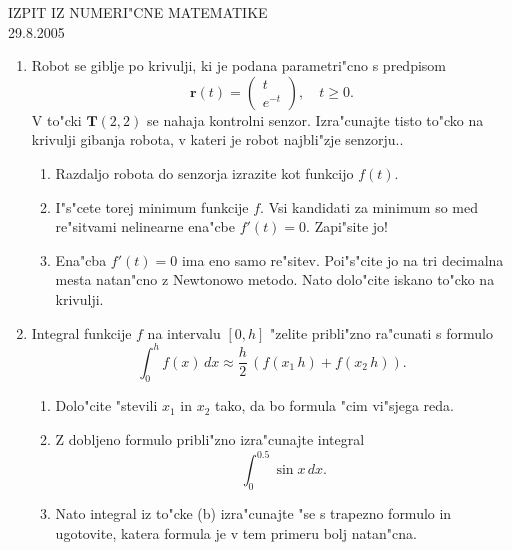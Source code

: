 

\begin{center}
  {\large IZPIT IZ NUMERI"CNE MATEMATIKE\\
    29.8.2005}
\end{center}
\vspace{1.5cm}
\begin{enumerate}
  \item Robot se giblje po krivulji, ki je podana parametri"cno
        s predpisom
        $$\mathbf{r}(t)=
        \left(
          \begin{array}{c}
            t\\
            e^{-t}
          \end{array}
        \right),\quad t\geq 0.
        $$
        V to"cki $\mathbf{T}(2,2)$ se nahaja kontrolni senzor. 
        Izra"cunajte tisto to"cko na krivulji gibanja 
        robota, v kateri je robot najbli"zje senzorju.. 
  \begin{enumerate}
    \item Razdaljo robota do senzorja izrazite kot funkcijo
      $f(t)$.
    \item I"s"cete torej minimum funkcije $f$. Vsi kandidati za 
      minimum so med re"sitvami nelinearne 
      ena"cbe $f'(t)=0$. Zapi"site jo!
    \item Ena"cba $f'(t)=0$ ima eno samo re"sitev. Poi"s"cite jo na
      tri decimalna mesta natan"cno z Newtonowo metodo. Nato
      dolo"cite iskano to"cko na krivulji.
  \end{enumerate}
  \item Integral funkcije $f$ na intervalu $[0,h]$ "zelite pribli"zno
    ra"cunati s formulo
    $$\int_0^h f(x)\,dx\approx \frac{h}{2}\,
    \left(f(x_1\,h)+f(x_2\,h)\right).$$
  \begin{enumerate}
    \item Dolo"cite "stevili $x_1$ in $x_2$ tako, da bo formula
      "cim vi"sjega reda.
    \item Z dobljeno formulo pribli"zno izra"cunajte integral
      $$\int_0^{0.5} \sin{x}\,dx.$$
    \item Nato integral iz to"cke (b) izra"cunajte "se s trapezno 
      formulo in ugotovite, katera formula je v tem primeru
      bolj natan"cna.
  \end{enumerate}
\end{enumerate}


